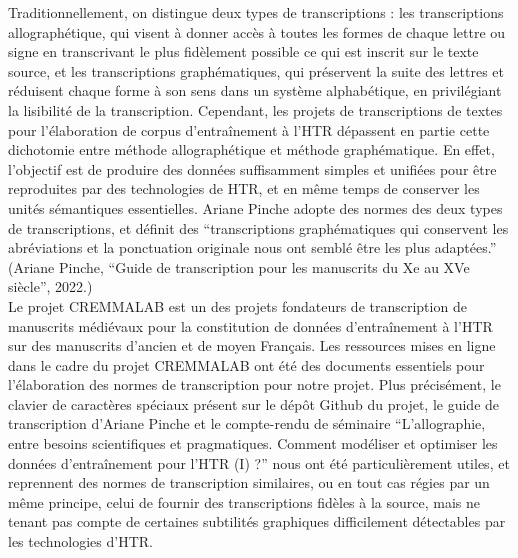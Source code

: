 \documentclass[12pt,a4paper]{article}
\begin{document}
Traditionnellement, on distingue deux types de transcriptions : les transcriptions allographétique, qui visent à donner accès à toutes les formes de chaque lettre ou signe en transcrivant le plus fidèlement possible ce qui est inscrit sur le texte source, et les transcriptions graphématiques, qui préservent la suite des lettres et réduisent chaque forme à son sens dans un système alphabétique, en privilégiant la lisibilité de la transcription. 
Cependant, les projets de transcriptions de textes pour l’élaboration de corpus d’entraînement à l’HTR dépassent en partie cette dichotomie entre méthode allographétique et méthode graphématique. En effet, l’objectif est de produire des données suffisamment simples et unifiées pour être reproduites par des technologies de HTR, et en même temps de conserver les unités sémantiques essentielles. Ariane Pinche adopte des normes des deux types de transcriptions, et  définit des “transcriptions graphématiques qui conservent les abréviations et la ponctuation originale nous ont semblé être les plus adaptées.” (Ariane Pinche, “Guide de transcription pour les manuscrits du Xe au XVe siècle”, 2022.)\\

Le projet CREMMALAB est un des projets fondateurs de transcription de manuscrits médiévaux pour la constitution de données d’entraînement à l’HTR sur des manuscrits d’ancien et de moyen Français.  Les ressources mises en ligne dans le cadre du projet CREMMALAB ont été des documents essentiels pour l’élaboration des normes de transcription pour notre projet. Plus précisément, le clavier de caractères spéciaux présent sur le dépôt Github du projet, le guide de transcription d’Ariane Pinche et le compte-rendu de séminaire “L’allographie, entre besoins scientifiques et pragmatiques. Comment modéliser et optimiser les données d’entraînement pour l’HTR (I) ?” nous ont été particulièrement utiles, et reprennent des normes de transcription similaires, ou en tout cas régies par un même principe, celui de fournir des transcriptions fidèles à la source, mais ne tenant pas compte de certaines subtilités graphiques difficilement détectables par les technologies d’HTR.\\
\end{document}
